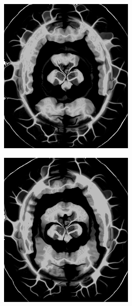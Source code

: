 \begin{figure}[h]
\begin{subfigure}[t]{0.25\textwidth}
	  \includegraphics[width=\textwidth]{figuras/resultDistDemons.png}
	  \label{fig:dist-image-demon}
	\end{subfigure}
	\begin{subfigure}[t]{0.25\textwidth}
	  \includegraphics[width=\textwidth]{figuras/resultSinDistDemon.png}

\end{subfigure}
\end{figure}
